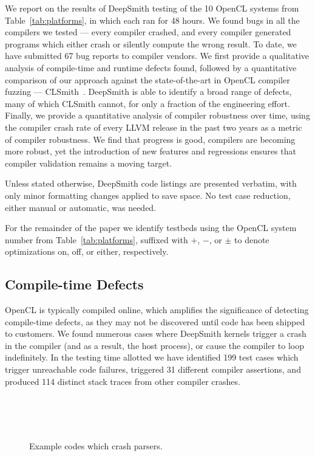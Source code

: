 \noindent
We report on the results of DeepSmith testing of the 10 OpenCL systems from
Table~\ref{tab:platforms}, in which each ran for 48 hours. We found bugs in all
the compilers we tested --- every compiler crashed, and every compiler generated
programs which either crash or silently compute the wrong result. To date, we
have submitted 67 bug reports to compiler vendors. We first provide a
qualitative analysis of compile-time and runtime defects found, followed by a
quantitative comparison of our approach against the state-of-the-art in OpenCL
compiler fuzzing --- CLSmith~\cite{Lidbury2015a}. DeepSmith is able to identify
a broad range of defects, many of which CLSmith cannot, for only a fraction of
the engineering effort. Finally, we provide a quantitative analysis of compiler
robustness over time, using the compiler crash rate of every LLVM release in the
past two years as a metric of compiler robustness. We find that progress is
good, compilers are becoming more robust, yet the introduction of new features
and regressions ensures that compiler validation remains a moving target.

Unless stated otherwise, DeepSmith code listings are presented verbatim, with
only minor formatting changes applied to save space. No test case reduction,
either manual or automatic, was needed.

For the remainder of the paper we identify testbeds using the OpenCL system
number from Table~\ref{tab:platforms}, suffixed with $+$, $-$, or $\pm$ to
denote optimizations on, off, or either, respectively.

\subsection{Compile-time Defects}%
\label{subsec:compile-time-defects}

OpenCL is typically compiled online, which amplifies the significance of
detecting compile-time defects, as they may not be discovered until code has
been shipped to customers. We found numerous cases where DeepSmith kernels
trigger a crash in the compiler (and as a result, the host process), or cause
the compiler to loop indefinitely. In the testing time allotted we have
identified 199 test cases which trigger unreachable code failures, triggered 31
different compiler assertions, and produced 114 distinct stack traces from other
compiler crashes.

\begin{figure}
  \centering %
  \\%
  \\%
  \\%
  \caption{Example codes which crash parsers.}%
  \label{lst:parser-crashes}
\end{figure}

